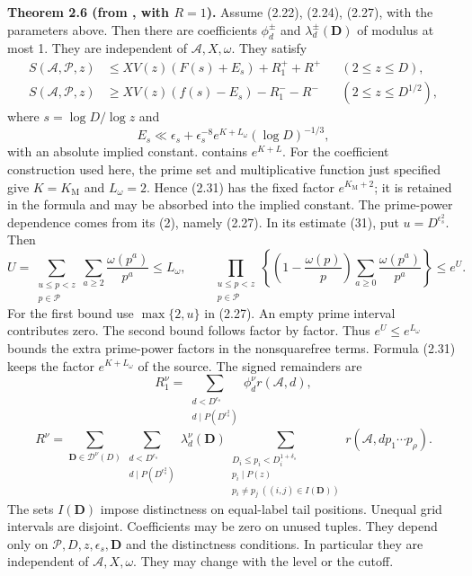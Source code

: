 \textbf{Theorem 2.6 (from \cite[Theorem~4]{AA37}, with $R=1$).} Assume (2.22), (2.24), (2.27), with the parameters above. Then there are coefficients $\phi_d^\pm$ and $\lambda_d^\pm(\mathbf D)$ of modulus at most 1. They are independent of $\mathcal A,X,\omega$. They satisfy
\[
\begin{aligned}
 S(\mathcal A,\mathcal P,z)&\leq XV(z)(F(s)+E_s)+R_1^++R^+
 &&(2\leq z\leq D),\\
 S(\mathcal A,\mathcal P,z)&\geq XV(z)(f(s)-E_s)-R_1^--R^-
 &&(2\leq z\leq D^{1/2}),
\end{aligned}
\tag{2.30}\label{p1:eq:2.30}
\]
where $s=\log D/\log z$ and
\[
 E_s\ll\epsilon_s+\epsilon_s^{-8}e^{K+L_\omega}(\log D)^{-1/3},
\tag{2.31}\label{p1:eq:2.31}
\]
with an absolute implied constant. \cite[Theorem~4]{AA37} contains $e^{K+L}$. For the coefficient construction used here, the prime set and multiplicative function just specified give $K=K_{\mathrm M}$ and $L_\omega=2$. Hence (2.31) has the fixed factor $e^{K_{\mathrm M}+2}$; it is retained in the formula and may be absorbed into the implied constant. The prime-power dependence comes from its (2), namely (2.27). In its estimate (31), put $u=D^{\epsilon_s^2}$. Then
\[
 U=\sum_{\substack{u\leq p<z\\p\in\mathcal P}}
       \sum_{a\geq2}\frac{\omega(p^a)}{p^a}\leq L_\omega,
 \qquad
 \prod_{\substack{u\leq p<z\\p\in\mathcal P}}
 \left\{\left(1-\frac{\omega(p)}p\right)
 \sum_{a\geq0}\frac{\omega(p^a)}{p^a}\right\}\leq e^U.
\]
For the first bound use $\max\{2,u\}$ in (2.27). An empty prime interval contributes zero. The second bound follows factor by factor. Thus $e^U\leq e^{L_\omega}$ bounds the extra prime-power factors in the nonsquarefree terms. Formula (2.31) keeps the factor $e^{K+L_\omega}$ of the source. The signed remainders are
\[
 R_1^\nu=\sum_{\substack{d<D^{\epsilon_s}\\d\mid P(D^{\epsilon_s^2})}}
 \phi_d^\nu r(\mathcal A,d),
\tag{2.32}\label{p1:eq:2.32}
\]
\[
 R^\nu=\sum_{\mathbf D\in\mathcal D^\nu(D)}
 \sum_{\substack{d<D^{\epsilon_s}\\d\mid P(D^{\epsilon_s^2})}}
 \lambda_d^\nu(\mathbf D)
 \sum_{\substack{D_i\leq p_i<D_i^{1+\delta_s}\\p_i\mid P(z)\\
                         p_i\ne p_j\ ((i,j)\in I(\mathbf D))}}
 r(\mathcal A,dp_1\cdots p_\rho).
\tag{2.33}\label{p1:eq:2.33}
\]
The sets $I(\mathbf D)$ impose distinctness on equal-label tail positions. Unequal grid intervals are disjoint. Coefficients may be zero on unused tuples. They depend only on $\mathcal P,D,z,\epsilon_s,\mathbf D$ and the distinctness conditions. In particular they are independent of $\mathcal A,X,\omega$. They may change with the level or the cutoff.

